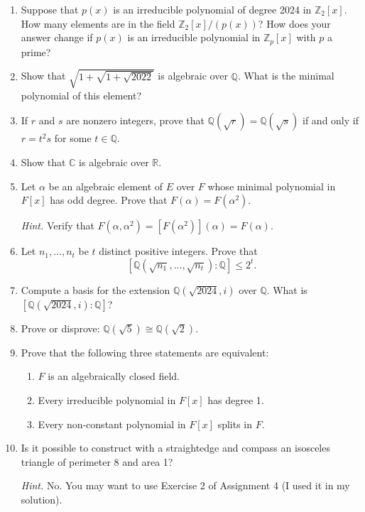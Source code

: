 \begin{enumerate}[label={\sffamily\bfseries\color{main}\arabic*.}]
	\item Suppose that $p(x)$ is an irreducible polynomial of degree 2024 in $\mathbb Z_2[x]$. How many elements are in the field $\mathbb Z_2[x]/(p(x))$? How does your answer change if $p(x)$ is an irreducible polynomial in $\mathbb Z_p[x]$ with $p$ a prime?

	\item Show that $\sqrt{1+\sqrt{1+\sqrt{2022}}}$ is algebraic over $\mathbb Q$. What is the minimal polynomial of this element?

	\item If $r$ and $s$ are nonzero integers, prove that $\mathbb Q(\sqrt{r})=\mathbb Q(\sqrt s)$ if and only if $r=t^2s$ for some $t\in\mathbb Q$.

	\item Show that $\mathbb C$ is algebraic over $\mathbb R$.

	\item Let $\alpha$ be an algebraic element of $E$ over $F$ whose minimal polynomial in $F[x]$ has odd degree. Prove that $F(\alpha)=F(\alpha^2)$.

	{\footnotesize\textit{\color{main}Hint.} Verify that $F(\alpha,\alpha^2)=[F(\alpha^2)](\alpha)=F(\alpha)$.\par}

	\item Let $n_1,\hdots,n_t$ be $t$ distinct positive integers. Prove that
	$$[\mathbb Q(\sqrt{n_1},\hdots,\sqrt{n_t}):\mathbb Q]\leq 2^t.$$

	\item Compute a basis for the extension $\mathbb Q(\sqrt{2024},i)$ over $\mathbb Q$. What is $[\mathbb Q(\sqrt{2024},i):\mathbb Q]$?

	\item Prove or disprove: $\mathbb Q(\sqrt 5)\cong\mathbb Q(\sqrt 2)$.

	\item Prove that the following three statements are equivalent:
	\begin{enumerate}
		\item $F$ is an algebraically closed field.
		\item Every irreducible polynomial in $F[x]$ has degree 1.
		\item Every non-constant polynomial in $F[x]$ splits in $F$.
	\end{enumerate}

	\item Is it possible to construct with a straightedge and compass an isosceles triangle of perimeter 8 and area 1?

	{\footnotesize\textit{\color{main}Hint.} No. You may want to use Exercise 2 of Assignment 4 (I used it in my solution).\par}
\end{enumerate}